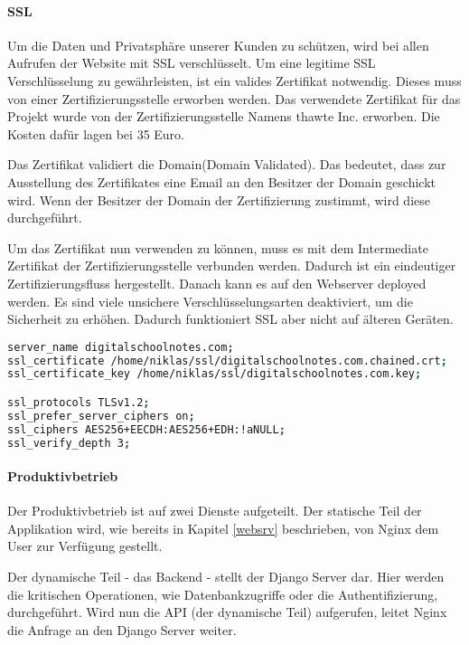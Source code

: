 \paragraph{SSL}
Um die Daten und Privatsphäre unserer Kunden zu schützen, wird bei allen Aufrufen der Website mit \gls{SSL} verschlüsselt. Um eine legitime SSL Verschlüsselung zu gewährleisten, ist ein valides Zertifikat notwendig. Dieses muss von einer Zertifizierungsstelle erworben werden. Das verwendete Zertifikat für das Projekt wurde von der Zertifizierungsstelle Namens thawte Inc. erworben.  Die Kosten dafür lagen bei 35 Euro. \cite{CERTIFICATE}

Das Zertifikat validiert die Domain(Domain Validated). Das bedeutet, dass zur Ausstellung des Zertifikates eine Email an den Besitzer der Domain geschickt wird. Wenn der Besitzer der Domain der Zertifizierung zustimmt, wird diese durchgeführt. 

Um das Zertifikat nun verwenden zu können, muss es mit dem Intermediate Zertifikat der Zertifizierungsstelle verbunden werden. Dadurch ist ein eindeutiger Zertifizierungsfluss hergestellt. Danach kann es auf den Webserver deployed werden. Es sind viele unsichere Verschlüsselungsarten deaktiviert, um die Sicherheit zu erhöhen. Dadurch funktioniert SSL aber nicht auf älteren Geräten.

\begin{lstlisting}[caption = Nginx SSL Konfiguration, label = fail2ban1, language=bash]
server_name digitalschoolnotes.com;
ssl_certificate /home/niklas/ssl/digitalschoolnotes.com.chained.crt;
ssl_certificate_key /home/niklas/ssl/digitalschoolnotes.com.key;

ssl_protocols TLSv1.2;
ssl_prefer_server_ciphers on;
ssl_ciphers AES256+EECDH:AES256+EDH:!aNULL;
ssl_verify_depth 3;
\end{lstlisting}
   
\paragraph{Produktivbetrieb}
Der Produktivbetrieb ist auf zwei Dienste aufgeteilt. Der statische Teil der Applikation wird, wie bereits in Kapitel \ref{websrv} beschrieben, von Nginx dem User zur Verfügung gestellt.  

Der dynamische Teil - das Backend - stellt der Django Server dar. Hier werden die kritischen Operationen, wie Datenbankzugriffe oder die Authentifizierung, durchgeführt. Wird nun die \gls{API} (der dynamische Teil) aufgerufen, leitet Nginx die Anfrage an den Django Server weiter. \\

